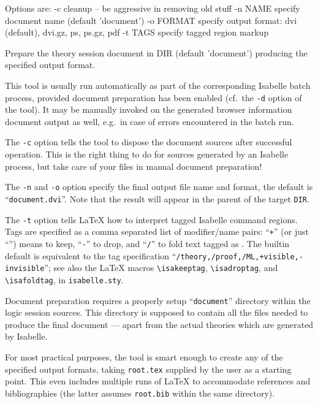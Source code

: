 \begin{isabellebody}
\begin{isamarkuptext}
\begin{ttbox}
  Options are:
    -c           cleanup -- be aggressive in removing old stuff
    -n NAME      specify document name (default 'document')
    -o FORMAT    specify output format: dvi (default), dvi.gz, ps,
                 ps.gz, pdf
    -t TAGS      specify tagged region markup

  Prepare the theory session document in DIR (default 'document')
  producing the specified output format.
\end{ttbox}
  This tool is usually run automatically as part of the corresponding
  Isabelle batch process, provided document preparation has been
  enabled (cf.\ the \verb|-d| option of the \hyperlink{tool.usedir}{\mbox{}}
  tool).  It may be manually invoked on the generated browser
  information document output as well, e.g.\ in case of errors
  encountered in the batch run.

  \medskip The \verb|-c| option tells the \hyperlink{tool.document}{\mbox{}} tool
  to dispose the document sources after successful operation.  This is
  the right thing to do for sources generated by an Isabelle process,
  but take care of your files in manual document preparation!

  \medskip The \verb|-n| and \verb|-o| option specify
  the final output file name and format, the default is ``\verb|document.dvi|''.  Note that the result will appear in the parent of
  the target \verb|DIR|.

  \medskip The \verb|-t| option tells {\LaTeX} how to interpret
  tagged Isabelle command regions.  Tags are specified as a comma
  separated list of modifier/name pairs: ``\verb|+|'' (or just ``'') means to keep, ``\verb|-|'' to drop, and ``\verb|/|'' to
  fold text tagged as .  The builtin default is equivalent
  to the tag specification ``\verb|/theory,/proof,/ML,+visible,-invisible|''; see also the {\LaTeX}
  macros \verb|\isakeeptag|, \verb|\isadroptag|, and
  \verb|\isafoldtag|, in \verb|isabelle.sty|.

  \medskip Document preparation requires a properly setup ``\verb|document|'' directory within the logic session sources.  This
  directory is supposed to contain all the files needed to produce the
  final document --- apart from the actual theories which are
  generated by Isabelle.

  \medskip For most practical purposes, the \hyperlink{tool.document}{\mbox{}} tool is
  smart enough to create any of the specified output formats, taking
  \verb|root.tex| supplied by the user as a starting point.  This
  even includes multiple runs of {\LaTeX} to accommodate references
  and bibliographies (the latter assumes \verb|root.bib| within
  the same directory).


\end{isamarkuptext}
\end{isabellebody}
